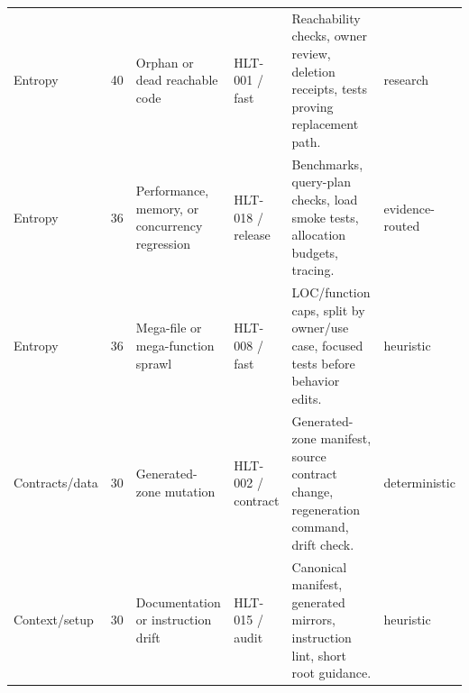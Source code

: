 \begin{table}[t]
\begin{tabularx}{\textwidth}{L{0.12\textwidth} R{0.04\textwidth} L{0.16\textwidth} L{0.15\textwidth} Y L{0.13\textwidth}}
Entropy & 40 & Orphan or dead reachable code & HLT-001 / fast & Reachability checks, owner review, deletion receipts, tests proving replacement path. & research \\
Entropy & 36 & Performance, memory, or concurrency regression & HLT-018 / release & Benchmarks, query-plan checks, load smoke tests, allocation budgets, tracing. & evidence-routed \\
Entropy & 36 & Mega-file or mega-function sprawl & HLT-008 / fast & LOC/function caps, split by owner/use case, focused tests before behavior edits. & heuristic \\
Contracts/data & 30 & Generated-zone mutation & HLT-002 / contract & Generated-zone manifest, source contract change, regeneration command, drift check. & deterministic \\
Context/setup & 30 & Documentation or instruction drift & HLT-015 / audit & Canonical manifest, generated mirrors, instruction lint, short root guidance. & heuristic \\
\bottomrule
\end{tabularx}
\end{table}

